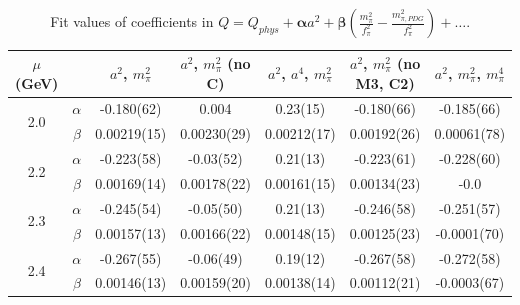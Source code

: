 \documentclass[12pt]{extarticle}
\begin{document}
\begin{table}[h!]
\begin{center}
\begin{tabular}{|c c|c|c|c|c|c|}
\hline
$\mu$ (GeV) &  & $a^2$, $m_\pi^2$& $a^2$, $m_\pi^2$ (no C)& $a^2$, $a^4$, $m_\pi^2$& $a^2$, $m_\pi^2$ (no M3, C2)& $a^2$, $m_\pi^2$, $m_\pi^4$\\
\hline
\multirow{2}{0.5in}{2.0} & $\alpha$ & -0.180(62)& 0.004& 0.23(15)& -0.180(66)& -0.185(66)\\
 & $\beta$ & 0.00219(15)& 0.00230(29)& 0.00212(17)& 0.00192(26)& 0.00061(78)\\
\hline
\multirow{2}{0.5in}{2.2} & $\alpha$ & -0.223(58)& -0.03(52)& 0.21(13)& -0.223(61)& -0.228(60)\\
 & $\beta$ & 0.00169(14)& 0.00178(22)& 0.00161(15)& 0.00134(23)& -0.0\\
\hline
\multirow{2}{0.5in}{2.3} & $\alpha$ & -0.245(54)& -0.05(50)& 0.21(13)& -0.246(58)& -0.251(57)\\
 & $\beta$ & 0.00157(13)& 0.00166(22)& 0.00148(15)& 0.00125(23)& -0.0001(70)\\
\hline
\multirow{2}{0.5in}{2.4} & $\alpha$ & -0.267(55)& -0.06(49)& 0.19(12)& -0.267(58)& -0.272(58)\\
 & $\beta$ & 0.00146(13)& 0.00159(20)& 0.00138(14)& 0.00112(21)& -0.0003(67)\\
\hline
\end{tabular}
\caption{Fit values of coefficients in $Q = Q_{phys} + \mathbf{\alpha} a^2 + \mathbf{\beta}\left(\frac{m_\pi^2}{f_\pi^2}-\frac{m_{\pi,PDG}^2}{f_\pi^2}\right) + \ldots$.}
\end{center}
\end{table}




















\clearpage
\end{document}
